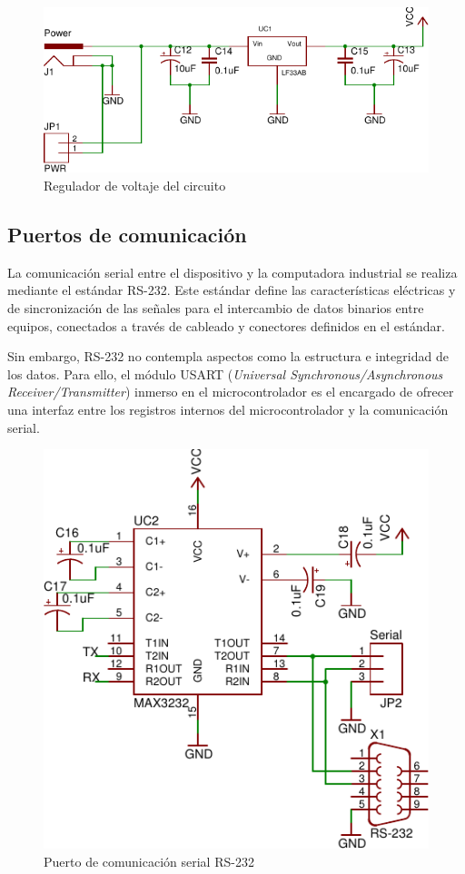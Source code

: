 \begin{figure}
	\centering
	\includegraphics[scale=0.8]{capitulo_3_imgs/esquematico_fuente.pdf}
	\caption{Regulador de voltaje del circuito}	
	\label{fig:esquematico_fuente}
\end{figure}

\subsection{Puertos de comunicaci\'on}

La comunicación serial entre el dispositivo y la computadora industrial se realiza mediante el estándar RS-232. Este estándar define las características eléctricas y de sincronización de las señales para el intercambio de datos binarios entre equipos, conectados a través de cableado y conectores definidos en el estándar. 

Sin embargo, RS-232 no contempla aspectos como la estructura e integridad de los datos. Para ello, el módulo USART (\textit{Universal Synchronous/Asynchronous Receiver/Transmitter}) inmerso en el microcontrolador es el encargado de ofrecer una interfaz entre los registros internos del microcontrolador y la comunicación serial. 

\begin{figure}
	\centering
	\includegraphics[scale=0.8]{capitulo_3_imgs/esquematico_max232.pdf}
	\caption{Puerto de comunicaci\'on serial RS-232}
	\label{fig:esquematico_max232}
\end{figure}

